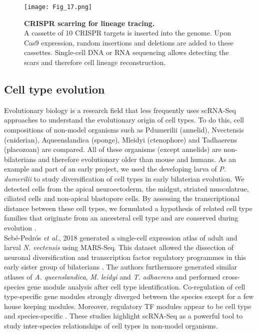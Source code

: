 \begin{figure}[!h]
\centering
\texttt{[image: Fig\_17.png]}
\caption[CRISPR/Cas9-scarring for lineage tracing]{\textbf{CRISPR scarring for lineage tracing.}\\
A cassette of 10 CRISPR targets is inserted into the genome. 
Upon Cas9 expression, random insertions and deletions are added to these cassettes. 
Single-cell DNA or RNA sequencing allows detecting the scars and therefore cell lineage reconstruction.}
\label{fig0:CRISPR}
\end{figure}

\subsection{Cell type evolution} 

Evolutionary biology is a research field that less frequently uses scRNA-Seq approaches to understand the evolutionary origin of cell types. 
To do this, cell compositions of non-model organisms such as \gls{Pdumerilii} (annelid), \gls{Nvectensis} (cniderian), \gls{Aqueenslandica} (sponge), \gls{Mleidyi} (ctenophore) and \gls{Tadhaerens} (placozoan) are compared. 
All of these organisms (except annelids) are non-bilaterians and therefore evolutionary older than mouse and humans. 
As an example and part of an early project, we used the developing larva of \textit{P. dumerilii} to study diversification of cell types in early bilaterian evolution. 
We detected cells from the apical neuroectoderm, the midgut, striated musculatrue, ciliated cells and non-apical blastopore cells. 
By assessing the transcriptional distance between these cell types, we formulated a hypothesis of related cell type families that originate from an ancesteral cell type and are conserved during evolution \citep{Achim2018}.  \\

Seb\'e{}-Pedr\'o{}s \emph{et al.}, 2018 generated a single-cell expression atlas of adult and larval \textit{N. vectensis} using MARS-Seq. 
This dataset allowed the dissection of neuronal diversification and transcription factor regulatory programmes in this early sister group of bilaterians \citep{Sebe-Pedros2018}. 
The authors furthermore generated similar atlases of \textit{A. queenslandica}, \textit{M. leidyi} and \textit{T. adhaerens} and performed cross-species gene module analysis after cell type identification. 
Co-regulation of cell type-specific gene modules strongly diverged between the species except for a few house keeping modules. 
Moreover, regulatory TF modules appear to be cell type and species-specific \citep{Sebe-Pedros2018a}. 
These studies highlight scRNA-Seq as a powerful tool to study inter-species relationships of cell types in non-model organisms. 

